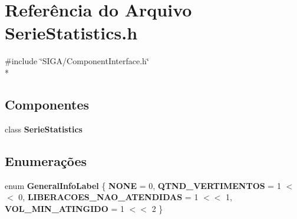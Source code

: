 \section{Referência do Arquivo Serie\+Statistics.\+h}
\label{_serie_statistics_8h}
{\ttfamily \#include \char`\"{}S\+I\+G\+A/\+Component\+Interface.\+h\char`\"{}}\\*
\subsection*{Componentes}
\begin{DoxyCompactItemize}
\item 
class {\bf Serie\+Statistics}
\end{DoxyCompactItemize}
\subsection*{Enumerações}
\begin{DoxyCompactItemize}
\item 
enum {\bf General\+Info\+Label} \{ {\bf N\+O\+NE} = 0, 
{\bf Q\+T\+N\+D\+\_\+\+V\+E\+R\+T\+I\+M\+E\+N\+T\+OS} = 1 $<$$<$ 0, 
{\bf L\+I\+B\+E\+R\+A\+C\+O\+E\+S\+\_\+\+N\+A\+O\+\_\+\+A\+T\+E\+N\+D\+I\+D\+AS} = 1 $<$$<$ 1, 
{\bf V\+O\+L\+\_\+\+M\+I\+N\+\_\+\+A\+T\+I\+N\+G\+I\+DO} = 1 $<$$<$ 2
 \}
\end{DoxyCompactItemize}
